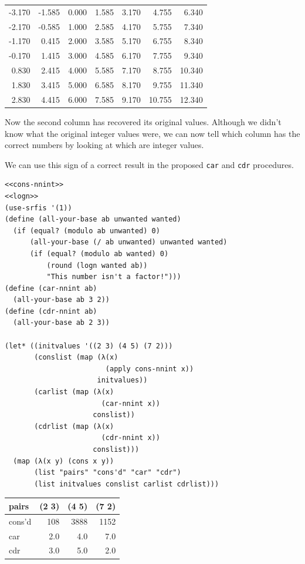 \documentclass[final,fleqn,titlepage]{article}
\begin{document}
\begin{center}
\begin{tabular}{rrrrrrr}
-3.170 & -1.585 & 0.000 & 1.585 & 3.170 & 4.755 & 6.340\\
-2.170 & -0.585 & 1.000 & 2.585 & 4.170 & 5.755 & 7.340\\
-1.170 & 0.415 & 2.000 & 3.585 & 5.170 & 6.755 & 8.340\\
-0.170 & 1.415 & 3.000 & 4.585 & 6.170 & 7.755 & 9.340\\
0.830 & 2.415 & 4.000 & 5.585 & 7.170 & 8.755 & 10.340\\
1.830 & 3.415 & 5.000 & 6.585 & 8.170 & 9.755 & 11.340\\
2.830 & 4.415 & 6.000 & 7.585 & 9.170 & 10.755 & 12.340\\
\end{tabular}
\end{center}

Now the second column has recovered its original values. Although we didn't know
what the original integer values were, we can now tell which column has the
correct numbers by looking at which are integer values.

We can use this sign of a correct result in the proposed \texttt{car} and \texttt{cdr} procedures.

\begin{verbatim}
<<cons-nnint>>
<<logn>>
(use-srfis '(1))
(define (all-your-base ab unwanted wanted)
  (if (equal? (modulo ab unwanted) 0)
      (all-your-base (/ ab unwanted) unwanted wanted)
      (if (equal? (modulo ab wanted) 0)
          (round (logn wanted ab))
          "This number isn't a factor!")))
(define (car-nnint ab)
  (all-your-base ab 3 2))
(define (cdr-nnint ab)
  (all-your-base ab 2 3))

(let* ((initvalues '((2 3) (4 5) (7 2)))
       (conslist (map (λ(x)
                        (apply cons-nnint x))
                      initvalues))
       (carlist (map (λ(x)
                       (car-nnint x))
                     conslist))
       (cdrlist (map (λ(x)
                       (cdr-nnint x))
                     conslist)))
  (map (λ(x y) (cons x y))
       (list "pairs" "cons'd" "car" "cdr")
       (list initvalues conslist carlist cdrlist)))
\end{verbatim}

\begin{center}
\begin{tabular}{lrrr}
pairs & (2 3) & (4 5) & (7 2)\\
\hline
cons'd & 108 & 3888 & 1152\\
car & 2.0 & 4.0 & 7.0\\
cdr & 3.0 & 5.0 & 2.0\\
\end{tabular}
\end{center}
\end{document}
